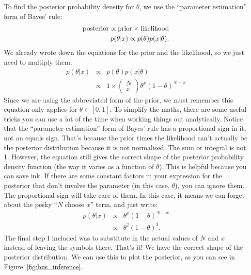 To find the posterior probability density for $\theta$, we use the ``parameter
estimation'' form of Bayes' rule:
\begin{eqnarray}
\textnormal{posterior} \propto \textnormal{prior} \times \textnormal{likelihood}\\
p(\theta|x) \propto p(\theta)p(x|\theta).
\end{eqnarray}
We already wrote down the equations for the prior and the likelihood, so we
just need to multiply them.
\begin{eqnarray}
p(\theta|x) &\propto& p(\theta)p(x|\theta)\\
&\propto& 1 \times \left(\begin{array}{c}N \\ x\end{array}\right)
\theta^x\left(1-\theta\right)^{N - x}
\end{eqnarray}
Since we are using the abbreviated form of the prior, we must remember this
equation only applies for $\theta \in [0, 1]$.
To simplify the maths, there are some useful tricks you can use a lot of the
time when working things out analytically. Notice that the ``parameter estimation''
form of Bayes' rule has a proportional sign in it, not an equals sign. That's
because the prior times the likelihood can't actually be the posterior
distribution because it is not normalised. The sum or integral is not 1.
However, the equation still gives the correct shape of the posterior probability density
function (the way it varies as a function of $\theta$). This is helpful because
you can save ink. If there are some constant factors in your expression for
the posterior
that don't involve the parameter (in this case, $\theta$), you can ignore them.
The proportional sign will take care of them. In this case, it means we can
forget about the pesky ``$N$ choose $x$'' term, and just write:
\begin{eqnarray}
p(\theta|x) &\propto& \theta^x\left(1-\theta\right)^{N - x}\\
&\propto& \theta^2\left(1-\theta\right)^3.
\end{eqnarray}
The final step I included was to substitute in the actual values of $N$ and $x$ instead of
leaving the symbols there. That's it! We have the correct shape of the
posterior distribution. We can use this to plot the posterior, as you can see
in Figure~\ref{fig:bus_inference}.

